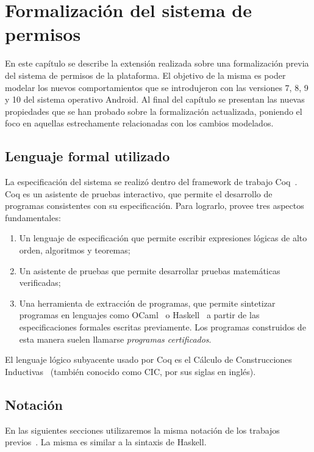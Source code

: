 \chapter{Formalización del sistema de permisos}
\label{chapter:formalization}

En este capítulo se describe la extensión realizada sobre una formalización previa\cite{luna-cleiej}
del sistema de permisos de la plataforma. El objetivo de la misma es poder modelar los nuevos
comportamientos que se introdujeron con las versiones 7, 8, 9 y 10 del sistema operativo Android. Al
final del capítulo se presentan las nuevas propiedades que se han probado sobre la formalización
actualizada, poniendo el foco en aquellas estrechamente relacionadas con los cambios modelados.

\section{Lenguaje formal utilizado}
\label{section:formalization:formal-language}
La especificación del sistema se realizó dentro del framework de trabajo Coq~\cite{coq}. Coq es un
asistente de pruebas interactivo, que permite el desarrollo de programas consistentes con su
especificación. Para lograrlo, provee tres aspectos fundamentales:
\begin{enumerate}
    \item Un lenguaje de especificación que permite escribir expresiones lógicas de alto orden,
          algoritmos y teoremas;
    \item Un asistente de pruebas que permite desarrollar pruebas matemáticas verificadas;
    \item Una herramienta de extracción de programas, que permite sintetizar programas en lenguajes
          como OCaml~\cite{ocaml} o Haskell~\cite{haskell} a partir de las especificaciones formales
          escritas previamente. Los programas construidos de esta manera suelen llamarse
          \textit{programas certificados}.
\end{enumerate}

El lenguaje lógico subyacente usado por Coq es el Cálculo de Construcciones Inductivas~\cite{cic}
(también conocido como CIC, por sus siglas en inglés).

\section{Notación}
En las siguientes secciones  utilizaremos la misma notación de los trabajos
previos~\cite{luna-cleiej,betarte-2017,betarte-2016}. La misma es similar a la sintaxis de Haskell.

